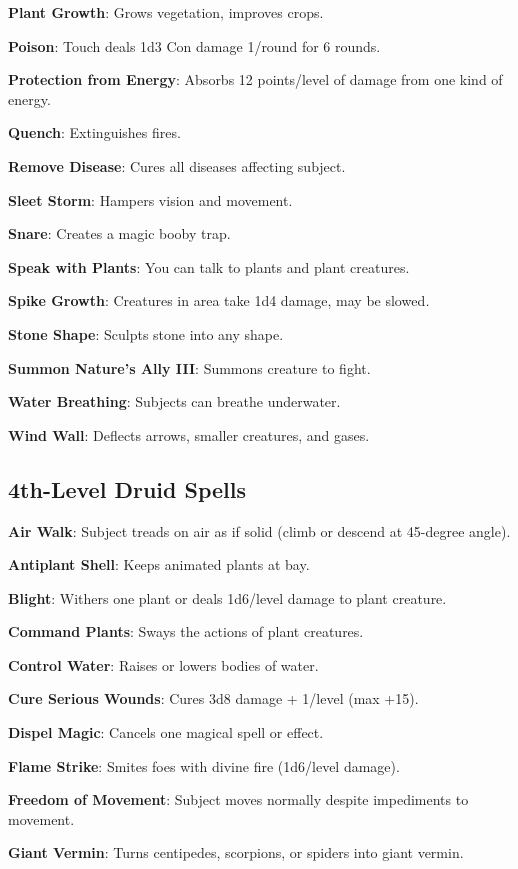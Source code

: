 \textbf{Plant Growth}: Grows vegetation, improves crops.

\textbf{Poison}: Touch deals 1d3 Con damage 1/round for 6 rounds.

\textbf{Protection from Energy}: Absorbs 12 points/level of damage from one kind of energy.

\textbf{Quench}: Extinguishes fires.

\textbf{Remove Disease}: Cures all diseases affecting subject.

\textbf{Sleet Storm}: Hampers vision and movement.

\textbf{Snare}: Creates a magic booby trap.

\textbf{Speak with Plants}: You can talk to plants and plant creatures.

\textbf{Spike Growth}: Creatures in area take 1d4 damage, may be slowed\textit{.}

\textbf{Stone Shape}: Sculpts stone into any shape.

\textbf{Summon Nature's Ally III}: Summons creature to fight.

\textbf{Water Breathing}: Subjects can breathe underwater.

\textbf{Wind Wall}: Deflects arrows, smaller creatures, and gases.

\subsection{4th-Level Druid Spells}


\textbf{Air Walk}: Subject treads on air as if solid (climb or descend at 45-degree angle).

\textbf{Antiplant Shell}: Keeps animated plants at bay.

\textbf{Blight}: Withers one plant or deals 1d6/level damage to plant creature.

\textbf{Command Plants}: Sways the actions of plant creatures.

\textbf{Control Water}: Raises or lowers bodies of water.

\textbf{Cure Serious Wounds}: Cures 3d8 damage + 1/level (max +15).

\textbf{Dispel Magic}: Cancels one magical spell or effect.

\textbf{Flame Strike}: Smites foes with divine fire (1d6/level damage).

\textbf{Freedom of Movement}: Subject moves normally despite impediments to movement.

\textbf{Giant Vermin}: Turns centipedes, scorpions, or spiders into giant vermin.

